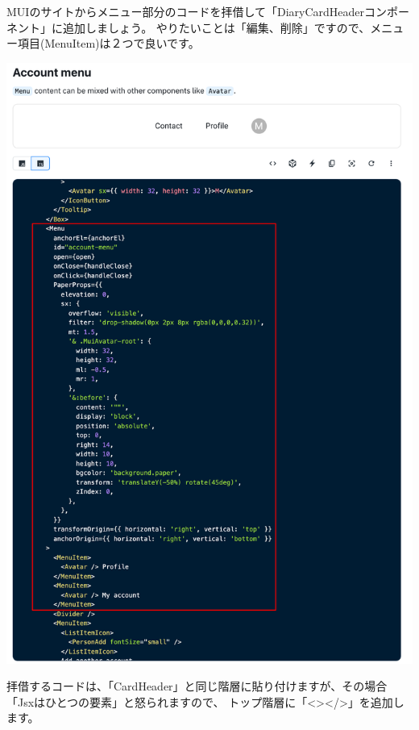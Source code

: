 MUIのサイトからメニュー部分のコードを拝借して「DiaryCardHeaderコンポーネント」に追加しましょう。
やりたいことは「編集、削除」ですので、メニュー項目(MenuItem)は２つで良いです。


\clearpage

\begin{reviewimage}%
\includegraphics[width=0.7\maxwidth]{./images/03-todo-with-react/mui011-card-MenuCode.png}%
\label{image:03-todo-with-react:mui011-card-MenuCode}
\end{reviewimage}

拝借するコードは、「CardHeader」と同じ階層に貼り付けますが、その場合「Jsxはひとつの要素」と怒られますので、
トップ階層に「\textless{}\textgreater{}\textless{}/\textgreater{}」を追加します。

